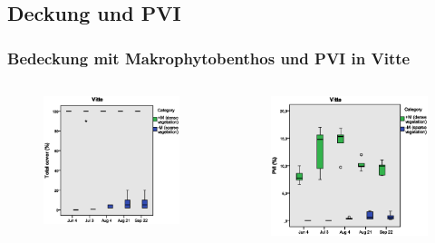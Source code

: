 \documentclass{beamer}
\begin{document}
\subsection{Deckung und PVI}
\begin{frame}
\frametitle{Bedeckung mit Makrophytobenthos und PVI in Vitte}
\begin{columns}
\begin{column}{5.5cm}
\begin{figure}
\includegraphics[width=\textwidth]{images/total_cover/total_cover1.eps}
\end{figure}
\end{column}
\begin{column}{5.5cm}
\begin{figure}
\includegraphics[width=\textwidth]{images/pvi/boxplot_pvi1.eps}
\end{figure}
\end{column}
\end{columns}
\end{frame}
\end{document}
